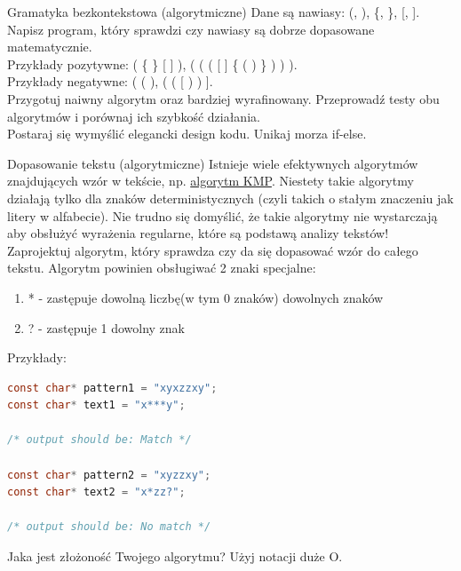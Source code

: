 \begin{exercise}{Gramatyka bezkontekstowa (algorytmiczne)}{}
Dane są nawiasy: (, ), \{, \}, [, ]. Napisz program, który sprawdzi czy nawiasy są dobrze dopasowane matematycznie. \\

Przykłady pozytywne: ( \{ \} [ ] ), ( ( ( [ ] \{ ( ) \} ) ) ). \\
Przykłady negatywne: ( ( ), ( ( [ ) ) ]. \\

Przygotuj naiwny algorytm oraz bardziej wyrafinowany. Przeprowadź testy obu algorytmów i porównaj ich szybkość działania. \\
Postaraj się wymyślić elegancki design kodu. Unikaj morza if-else.
\end{exercise}

\begin{exercise}{Dopasowanie tekstu (algorytmiczne)}{}
Istnieje wiele efektywnych algorytmów znajdujących wzór w tekście, np. \href{https://en.wikipedia.org/wiki/Knuth\%E2\%80\%93Morris\%E2\%80\%93Pratt_algorithm}{algorytm KMP}. Niestety takie algorytmy działają tylko dla znaków deterministycznych (czyli takich o stałym znaczeniu jak litery w alfabecie).
Nie trudno się domyślić, że takie algorytmy nie wystarczają aby obsłużyć wyrażenia regularne, które są podstawą analizy tekstów! \\

Zaprojektuj algorytm, który sprawdza czy da się dopasować wzór do całego tekstu. Algorytm powinien obsługiwać 2 znaki specjalne:
\begin{enumerate}
    \item * - zastępuje dowolną liczbę(w tym 0 znaków) dowolnych znaków
    \item ? - zastępuje 1 dowolny znak
\end{enumerate}

Przykłady:
\begin{lstlisting}[language=C,style=C99]
const char* pattern1 = "xyxzzxy";
const char* text1 = "x***y";
    
/* output should be: Match */
    
const char* pattern2 = "xyzzxy";
const char* text2 = "x*zz?";
    
/* output should be: No match */
\end{lstlisting}

Jaka jest złożoność Twojego algorytmu? Użyj notacji duże O.
\end{exercise}

